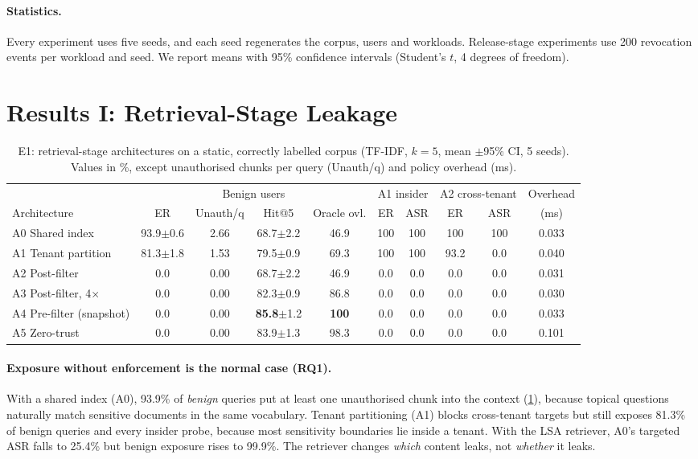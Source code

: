 \documentclass[10pt]{article}
\newcommand{\pmci}[1]{{\scriptsize$\pm$#1}}
\begin{document}
\paragraph{Statistics.}
Every experiment uses five seeds, and each seed regenerates the corpus, users and workloads. Release-stage experiments use 200 revocation events per workload and seed. We report means with 95\% confidence intervals (Student's $t$, 4 degrees of freedom).

\section{Results I: Retrieval-Stage Leakage}
\label{sec:resA}

\begin{table}[t]
\centering
\caption{E1: retrieval-stage architectures on a static, correctly labelled corpus (TF-IDF, $k{=}5$, mean \pmci{95\% CI}, 5 seeds). Values in \%, except unauthorised chunks per query (Unauth/q) and policy overhead (ms).}
\label{tab:main}
\small
\setlength{\tabcolsep}{4pt}
\begin{tabular}{lcccc|cc|cc|c}
\toprule
& \multicolumn{4}{c|}{Benign users} & \multicolumn{2}{c|}{A1 insider} & \multicolumn{2}{c|}{A2 cross-tenant} & Overhead\\
Architecture & ER & Unauth/q & Hit@5 & Oracle ovl. & ER & ASR & ER & ASR & (ms)\\
\midrule
A0 Shared index & 93.9\pmci{0.6} & 2.66 & 68.7\pmci{2.2} & 46.9 & 100 & 100 & 100 & 100 & 0.033\\
A1 Tenant partition & 81.3\pmci{1.8} & 1.53 & 79.5\pmci{0.9} & 69.3 & 100 & 100 & 93.2 & 0.0 & 0.040\\
A2 Post-filter & 0.0 & 0.00 & 68.7\pmci{2.2} & 46.9 & 0.0 & 0.0 & 0.0 & 0.0 & 0.031\\
A3 Post-filter, 4$\times$ & 0.0 & 0.00 & 82.3\pmci{0.9} & 86.8 & 0.0 & 0.0 & 0.0 & 0.0 & 0.030\\
A4 Pre-filter (snapshot) & 0.0 & 0.00 & \textbf{85.8}\pmci{1.2} & \textbf{100} & 0.0 & 0.0 & 0.0 & 0.0 & 0.033\\
A5 Zero-trust & 0.0 & 0.00 & 83.9\pmci{1.3} & 98.3 & 0.0 & 0.0 & 0.0 & 0.0 & 0.101\\
\bottomrule
\end{tabular}
\end{table}

\paragraph{Exposure without enforcement is the normal case (RQ1).}
With a shared index (A0), 93.9\% of \emph{benign} queries put at least one unauthorised chunk into the context (\cref{tab:main}), because topical questions naturally match sensitive documents in the same vocabulary. Tenant partitioning (A1) blocks cross-tenant targets but still exposes 81.3\% of benign queries and every insider probe, because most sensitivity boundaries lie inside a tenant. With the LSA retriever, A0's targeted ASR falls to 25.4\% but benign exposure rises to 99.9\%. The retriever changes \emph{which} content leaks, not \emph{whether} it leaks.
\end{document}
